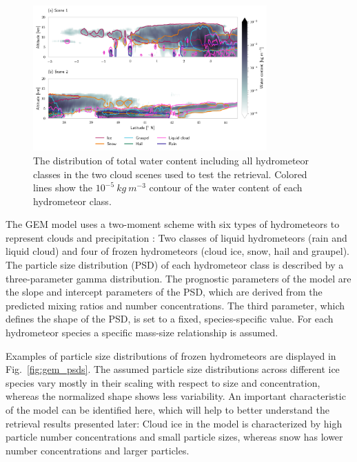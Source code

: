 \documentclass[journal abbreviation, manuscript]{copernicus}
\begin{document}
\begin{figure}[h!]
\centering
\includegraphics[width = 0.8\textwidth]{../plots/scene_overview.png}
\caption{The distribution of total water content including all hydrometeor
  classes in the two cloud scenes used to test the retrieval. Colored lines show the
  $10^{-5}\ \unit{kg\ m^{-3}}$ contour of the water content of each hydrometeor class.}
\label{fig:overview}
\end{figure}

The GEM model uses a two-moment scheme with six types of hydrometeors to
represent clouds and precipitation \citep{milbrandtyau05}: Two classes of liquid
hydrometeors (rain and liquid cloud) and four of frozen hydrometeors (cloud ice,
snow, hail and graupel). The particle size distribution (PSD) of each
hydrometeor class is described by a three-parameter gamma distribution. The
prognostic parameters of the model are the slope and intercept parameters of the
PSD, which are derived from the predicted mixing ratios and number
concentrations. The third parameter, which defines the shape of the PSD, is set
to a fixed, species-specific value. For each hydrometeor species a specific
mass-size relationship is assumed.

Examples of particle size distributions of frozen hydrometeors are displayed in
Fig.~\ref{fig:gem_psds}. The assumed particle size distributions across
different ice species vary mostly in their scaling with respect to size and
concentration, whereas the normalized shape shows less variability. An important
characteristic of the model can be identified here, which will help to better
understand the retrieval results presented later: Cloud ice in the model is
characterized by high particle number concentrations and small particle sizes,
whereas snow has lower number concentrations and larger particles.
\end{document}
